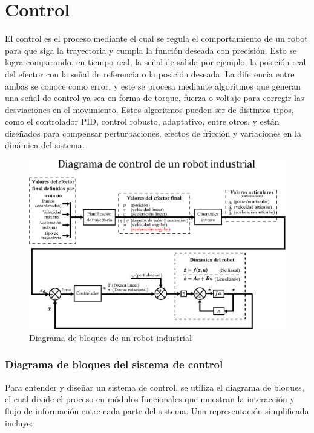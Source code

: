 \section{Control}
El control es el proceso mediante el cual se regula el comportamiento de un robot para que siga la trayectoria y cumpla la función deseada con precisión. Esto se logra comparando, en tiempo real, la señal de salida por ejemplo, la posición real del efector con la señal de referencia o la posición deseada. La diferencia entre ambas se conoce como error, y este se procesa mediante algoritmos que generan una señal de control ya sea en forma de torque, fuerza o voltaje para corregir las desviaciones en el movimiento. Estos algoritmos pueden ser de distintos tipos, como el controlador PID, control robusto, adaptativo, entre otros, y están diseñados para compensar perturbaciones, efectos de fricción y variaciones en la dinámica del sistema.

\begin{figure}[h]
	\centering
	\includegraphics[width=\linewidth]{img/Diagrama_robot_industrial}
	\caption{Diagrama de bloques de un robot industrial}
	\label{fig:diagrama-de-robot-industrial}
\end{figure}

\subsubsection{Diagrama de bloques del sistema de control}

Para entender y diseñar un sistema de control, se utiliza el diagrama de bloques, el cual divide el proceso en módulos funcionales que muestran la interacción y flujo de información entre cada parte del sistema. Una representación simplificada incluye:

